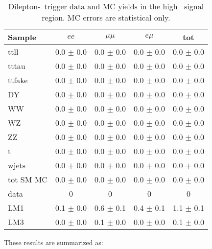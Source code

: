 \begin{table}[hbt]
\begin{center}
\footnotesize
\caption{\label{tab:lowptsigyield3} Dilepton-\Ht\ trigger data and MC yields in the high \Ht\ signal region.
MC errors are statistical only.}
\begin{tabular}{l|cccc}
\hline
         Sample   &           $ee$   &       $\mu\mu$   &         $e\mu$   &            tot  \\
\hline
           ttll   &  0.0 $\pm$ 0.0   &  0.0 $\pm$ 0.0   &  0.0 $\pm$ 0.0   &  0.0 $\pm$ 0.0  \\
          tttau   &  0.0 $\pm$ 0.0   &  0.0 $\pm$ 0.0   &  0.0 $\pm$ 0.0   &  0.0 $\pm$ 0.0  \\
         ttfake   &  0.0 $\pm$ 0.0   &  0.0 $\pm$ 0.0   &  0.0 $\pm$ 0.0   &  0.0 $\pm$ 0.0  \\
             DY   &  0.0 $\pm$ 0.0   &  0.0 $\pm$ 0.0   &  0.0 $\pm$ 0.0   &  0.0 $\pm$ 0.0  \\
             WW   &  0.0 $\pm$ 0.0   &  0.0 $\pm$ 0.0   &  0.0 $\pm$ 0.0   &  0.0 $\pm$ 0.0  \\
             WZ   &  0.0 $\pm$ 0.0   &  0.0 $\pm$ 0.0   &  0.0 $\pm$ 0.0   &  0.0 $\pm$ 0.0  \\
             ZZ   &  0.0 $\pm$ 0.0   &  0.0 $\pm$ 0.0   &  0.0 $\pm$ 0.0   &  0.0 $\pm$ 0.0  \\
              t   &  0.0 $\pm$ 0.0   &  0.0 $\pm$ 0.0   &  0.0 $\pm$ 0.0   &  0.0 $\pm$ 0.0  \\
          wjets   &  0.0 $\pm$ 0.0   &  0.0 $\pm$ 0.0   &  0.0 $\pm$ 0.0   &  0.0 $\pm$ 0.0  \\
\hline
      tot SM MC   &  0.0 $\pm$ 0.0   &  0.0 $\pm$ 0.0   &  0.0 $\pm$ 0.0   &  0.0 $\pm$ 0.0  \\
\hline
           data   &              0   &              0   &              0   &              0  \\
\hline
            LM1   &  0.1 $\pm$ 0.0   &  0.6 $\pm$ 0.1   &  0.4 $\pm$ 0.1   &  1.1 $\pm$ 0.1  \\
            LM3   &  0.0 $\pm$ 0.0   &  0.1 $\pm$ 0.0   &  0.0 $\pm$ 0.0   &  0.1 $\pm$ 0.0  \\
\hline
\end{tabular}
\end{center}
\end{table}

\newpage

These results are summarized as:

